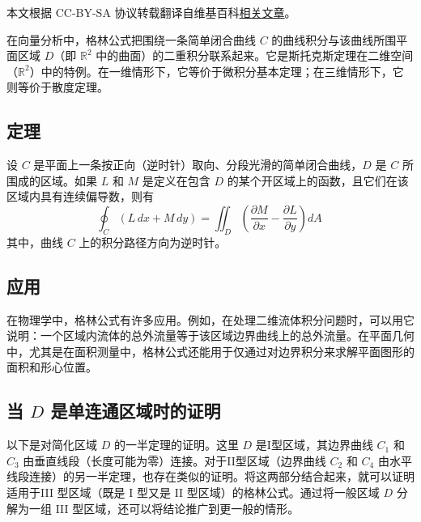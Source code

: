 
本文根据 CC-BY-SA 协议转载翻译自维基百科\href{https://en.wikipedia.org/wiki/Green\%27s_theorem}{相关文章}。

在向量分析中，格林公式把围绕一条简单闭合曲线 $C$ 的曲线积分与该曲线所围平面区域 $D$（即 $\mathbb{R}^2$ 中的曲面）的二重积分联系起来。它是斯托克斯定理在二维空间（$\mathbb{R}^2$）中的特例。在一维情形下，它等价于微积分基本定理；在三维情形下，它则等价于散度定理。
\subsection{定理}
设 $C$ 是平面上一条按正向（逆时针）取向、分段光滑的简单闭合曲线，$D$ 是 $C$ 所围成的区域。如果 $L$ 和 $M$ 是定义在包含 $D$ 的某个开区域上的函数，且它们在该区域内具有连续偏导数，则有
$$
\oint_{C} (L\,dx + M\,dy) 
= 
\iint_{D} 
\left( 
\frac{\partial M}{\partial x} 
- 
\frac{\partial L}{\partial y} 
\right) dA~
$$
其中，曲线 $C$ 上的积分路径方向为逆时针。
\subsection{应用}
在物理学中，格林公式有许多应用。例如，在处理二维流体积分问题时，可以用它说明：一个区域内流体的总外流量等于该区域边界曲线上的总外流量。在平面几何中，尤其是在面积测量中，格林公式还能用于仅通过对边界积分来求解平面图形的面积和形心位置。
\subsection{当 $D$ 是单连通区域时的证明}
以下是对简化区域 $D$ 的一半定理的证明。这里 $D$ 是I型区域，其边界曲线 $C_1$ 和 $C_3$ 由垂直线段（长度可能为零）连接。对于II型区域（边界曲线 $C_2$ 和 $C_4$ 由水平线段连接）的另一半定理，也存在类似的证明。将这两部分结合起来，就可以证明适用于III 型区域（既是 I 型又是 II 型区域）的格林公式。通过将一般区域 $D$ 分解为一组 III 型区域，还可以将结论推广到更一般的情形。

